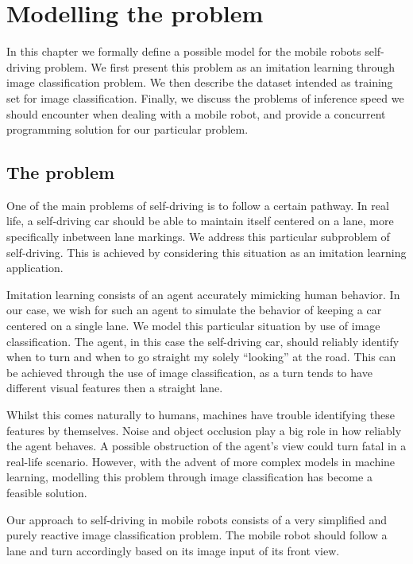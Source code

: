 
\chapter{Modelling the problem}\label{chp:modelling}

In this chapter we formally define a possible model for the mobile robots self-driving problem.  We
first present this problem as an imitation learning through image classification problem. We then
describe the dataset intended as training set for image classification. Finally, we discuss the
problems of inference speed we should encounter when dealing with a mobile robot, and provide a
concurrent programming solution for our particular problem.

\section{The problem}

One of the main problems of self-driving is to follow a certain pathway. In real life, a
self-driving car should be able to maintain itself centered on a lane, more specifically inbetween
lane markings. We address this particular subproblem of self-driving. This is achieved by
considering this situation as an imitation learning application.

Imitation learning consists of an agent accurately mimicking human behavior. In our case, we wish
for such an agent to simulate the behavior of keeping a car centered on a single lane. We model
this particular situation by use of image classification. The agent, in this case the self-driving
car, should reliably identify when to turn and when to go straight my solely ``looking'' at the
road. This can be achieved through the use of image classification, as a turn tends to have
different visual features then a straight lane.

Whilst this comes naturally to humans, machines have trouble identifying these features by
themselves.  Noise and object occlusion play a big role in how reliably the agent behaves. A
possible obstruction of the agent's view could turn fatal in a real-life scenario. However, with
the advent of more complex models in machine learning, modelling this problem through image
classification has become a feasible solution.

Our approach to self-driving in mobile robots consists of a very simplified and purely reactive
image classification problem. The mobile robot should follow a lane and turn accordingly based on
its image input of its front view.

